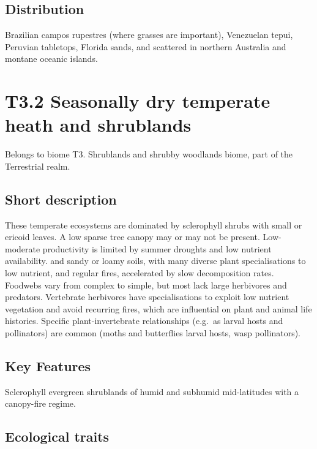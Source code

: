 \documentclass[
  letterpaper,
  DIV=11,
  numbers=noendperiod]{scrartcl}
\begin{document}
\subsection{Distribution}\label{distribution-79}

Brazilian campos rupestres (where grasses are important), Venezuelan
tepui, Peruvian tabletops, Florida sands, and scattered in northern
Australia and montane oceanic islands.

\section{T3.2 Seasonally dry temperate heath and
shrublands}\label{t3.2-seasonally-dry-temperate-heath-and-shrublands}

Belongs to biome T3. Shrublands and shrubby woodlands biome, part of the
Terrestrial realm.

\subsection{Short description}\label{short-description-80}

These temperate ecosystems are dominated by sclerophyll shrubs with
small or ericoid leaves. A low sparse tree canopy may or may not be
present. Low-moderate productivity is limited by summer droughts and low
nutrient availability. and sandy or loamy soils, with many diverse plant
specialisations to low nutrient, and regular fires, accelerated by slow
decomposition rates. Foodwebs vary from complex to simple, but most lack
large herbivores and predators. Vertebrate herbivores have
specialisations to exploit low nutrient vegetation and avoid recurring
fires, which are influential on plant and animal life histories.
Specific plant-invertebrate relationships (e.g.~as larval hosts and
pollinators) are common (moths and butterflies larval hosts, wasp
pollinators).

\subsection{Key Features}\label{key-features-80}

Sclerophyll evergreen shrublands of humid and subhumid mid-latitudes
with a canopy-fire regime.

\subsection{Ecological traits}\label{ecological-traits-80}
\end{document}
